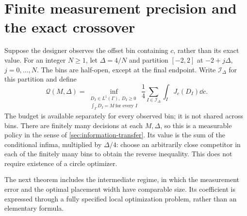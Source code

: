 \section{Finite measurement precision and the exact crossover}
\label{sec:finite-precision}
Suppose the designer observes the offset bin containing $c$, rather
than its exact value. For an integer $N\ge1$, let $\Delta=4/N$ and
partition $[-2,2]$ at $-2+j\Delta$, $j=0,\ldots,N$. The bins are
half-open, except at the final endpoint. Write $\mathcal I_\Delta$
for this partition and define
\begin{equation}\label{eq:bin-value}
 \mathcal Q(M,\Delta)=
 \inf_{\substack{D_I\in L^1(\Gamma),\ D_I\ge0\\
                  \int_\Gamma D_I=M\ \text{for every }I}}
       \frac14\sum_{I\in\mathcal I_\Delta}\int_I J_c(D_I)\dd c.
\end{equation}
The budget is available separately for every observed bin; it is
not shared across bins. There are finitely many decisions at each
$M,\Delta$, so this is a measurable policy in the sense of
\cref{sec:information-transfer}. Its value is the sum of the
conditional infima, multiplied by $\Delta/4$: choose an arbitrarily
close competitor in each of the finitely many bins to obtain the
reverse inequality. This does not require existence of a circle
optimizer.

The next theorem includes the intermediate regime, in which the
measurement error and the optimal placement width have comparable
size. Its coefficient is expressed through a fully specified local
optimization problem, rather than an elementary formula.

